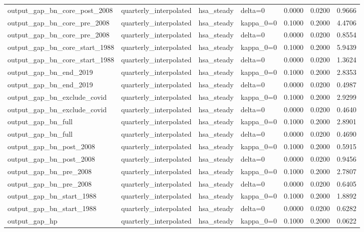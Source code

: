 \begin{tabular}{llllrrr}
output\_gap\_bn\_core\_post\_2008 & quarterly\_interpolated & hsa\_steady & delta=0 & 0.0000 & 0.0200 & 0.9666 \\
output\_gap\_bn\_core\_pre\_2008 & quarterly\_interpolated & hsa\_steady & kappa\_0=0 & 0.1000 & 0.2000 & 4.4706 \\
output\_gap\_bn\_core\_pre\_2008 & quarterly\_interpolated & hsa\_steady & delta=0 & 0.0000 & 0.0200 & 0.8554 \\
output\_gap\_bn\_core\_start\_1988 & quarterly\_interpolated & hsa\_steady & kappa\_0=0 & 0.1000 & 0.2000 & 5.9439 \\
output\_gap\_bn\_core\_start\_1988 & quarterly\_interpolated & hsa\_steady & delta=0 & 0.0000 & 0.0200 & 1.3624 \\
output\_gap\_bn\_end\_2019 & quarterly\_interpolated & hsa\_steady & kappa\_0=0 & 0.1000 & 0.2000 & 2.8353 \\
output\_gap\_bn\_end\_2019 & quarterly\_interpolated & hsa\_steady & delta=0 & 0.0000 & 0.0200 & 0.4987 \\
output\_gap\_bn\_exclude\_covid & quarterly\_interpolated & hsa\_steady & kappa\_0=0 & 0.1000 & 0.2000 & 2.9299 \\
output\_gap\_bn\_exclude\_covid & quarterly\_interpolated & hsa\_steady & delta=0 & 0.0000 & 0.0200 & 0.4640 \\
output\_gap\_bn\_full & quarterly\_interpolated & hsa\_steady & kappa\_0=0 & 0.1000 & 0.2000 & 2.8901 \\
output\_gap\_bn\_full & quarterly\_interpolated & hsa\_steady & delta=0 & 0.0000 & 0.0200 & 0.4690 \\
output\_gap\_bn\_post\_2008 & quarterly\_interpolated & hsa\_steady & kappa\_0=0 & 0.1000 & 0.2000 & 0.5915 \\
output\_gap\_bn\_post\_2008 & quarterly\_interpolated & hsa\_steady & delta=0 & 0.0000 & 0.0200 & 0.9456 \\
output\_gap\_bn\_pre\_2008 & quarterly\_interpolated & hsa\_steady & kappa\_0=0 & 0.1000 & 0.2000 & 2.7807 \\
output\_gap\_bn\_pre\_2008 & quarterly\_interpolated & hsa\_steady & delta=0 & 0.0000 & 0.0200 & 0.6405 \\
output\_gap\_bn\_start\_1988 & quarterly\_interpolated & hsa\_steady & kappa\_0=0 & 0.1000 & 0.2000 & 1.8892 \\
output\_gap\_bn\_start\_1988 & quarterly\_interpolated & hsa\_steady & delta=0 & 0.0000 & 0.0200 & 0.6282 \\
output\_gap\_hp & quarterly\_interpolated & hsa\_steady & kappa\_0=0 & 0.1000 & 0.2000 & 0.0622 \\

\end{tabular}

